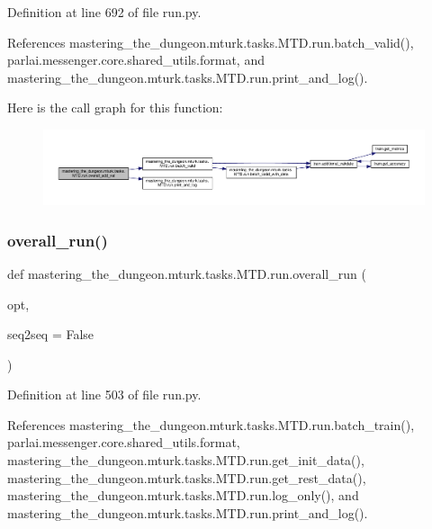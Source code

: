 Definition at line 692 of file run.\+py.



References mastering\+\_\+the\+\_\+dungeon.\+mturk.\+tasks.\+M\+T\+D.\+run.\+batch\+\_\+valid(), parlai.\+messenger.\+core.\+shared\+\_\+utils.\+format, and mastering\+\_\+the\+\_\+dungeon.\+mturk.\+tasks.\+M\+T\+D.\+run.\+print\+\_\+and\+\_\+log().

Here is the call graph for this function\+:
\nopagebreak
\begin{figure}[H]
\begin{center}
\leavevmode
\includegraphics[width=350pt]{namespacemastering__the__dungeon_1_1mturk_1_1tasks_1_1MTD_1_1run_a56de28aa93db7fed38e30a16e85a1222_cgraph}
\end{center}
\end{figure}
\mbox{\label{namespacemastering__the__dungeon_1_1mturk_1_1tasks_1_1MTD_1_1run_aba096c2ad490fe6481c7a7ff36e60784}} 
\subsubsection{\texorpdfstring{overall\+\_\+run()}{overall\_run()}}
{\footnotesize\ttfamily def mastering\+\_\+the\+\_\+dungeon.\+mturk.\+tasks.\+M\+T\+D.\+run.\+overall\+\_\+run (\begin{DoxyParamCaption}\item[{}]{opt,  }\item[{}]{seq2seq = {\ttfamily False} }\end{DoxyParamCaption})}



Definition at line 503 of file run.\+py.



References mastering\+\_\+the\+\_\+dungeon.\+mturk.\+tasks.\+M\+T\+D.\+run.\+batch\+\_\+train(), parlai.\+messenger.\+core.\+shared\+\_\+utils.\+format, mastering\+\_\+the\+\_\+dungeon.\+mturk.\+tasks.\+M\+T\+D.\+run.\+get\+\_\+init\+\_\+data(), mastering\+\_\+the\+\_\+dungeon.\+mturk.\+tasks.\+M\+T\+D.\+run.\+get\+\_\+rest\+\_\+data(), mastering\+\_\+the\+\_\+dungeon.\+mturk.\+tasks.\+M\+T\+D.\+run.\+log\+\_\+only(), and mastering\+\_\+the\+\_\+dungeon.\+mturk.\+tasks.\+M\+T\+D.\+run.\+print\+\_\+and\+\_\+log().

